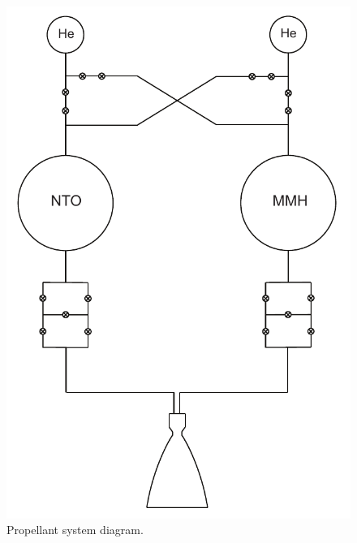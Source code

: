 \documentclass[paper=letter, fontsize=11pt]{scrartcl} %
\numberwithin{equation}{section} %
\numberwithin{figure}{section} %
\numberwithin{table}{section} %
\begin{document}
\begin{figure}[H]
    \begin{center}
        \includegraphics[height=.4\textheight]{propellant_system_diagram.pdf}
        \caption{Propellant system diagram.}
    \end{center}
\end{figure}
\end{document}
